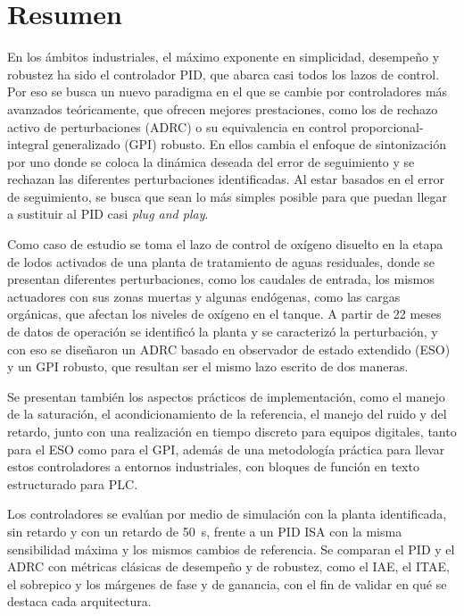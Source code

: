 \chapter*{Resumen}

En los ámbitos industriales, el máximo exponente en simplicidad, desempeño y robustez ha sido el
controlador PID, que abarca casi todos los lazos de control. Por eso se busca un nuevo paradigma en
el que se cambie por controladores más avanzados teóricamente, que ofrecen mejores prestaciones, como
los de rechazo activo de perturbaciones (ADRC) o su equivalencia en control
proporcional-integral generalizado (GPI) robusto. En ellos cambia el enfoque de sintonización por uno donde
se coloca la dinámica deseada del error de seguimiento y se rechazan las diferentes perturbaciones
identificadas. Al estar basados en el error de seguimiento, se busca que sean lo más simples posible
para que puedan llegar a sustituir al PID casi \emph{plug and play}.

Como caso de estudio se toma el lazo de control de oxígeno disuelto en la etapa de lodos activados
de una planta de tratamiento de aguas residuales, donde se presentan diferentes perturbaciones, como
los caudales de entrada, los mismos actuadores con sus zonas muertas y algunas endógenas, como las
cargas orgánicas, que afectan los niveles de oxígeno en el tanque. A partir de 22 meses de datos de
operación se identificó la planta y se caracterizó la perturbación, y con eso se diseñaron un ADRC
basado en observador de estado extendido (ESO) y un GPI robusto, que resultan ser el mismo lazo escrito de
dos maneras.

Se presentan también los aspectos prácticos de implementación, como el manejo de la saturación, el
acondicionamiento de la referencia, el manejo del ruido y del retardo, junto con una realización en
tiempo discreto para equipos digitales, tanto para el ESO como para el GPI, además de una metodología
práctica para llevar estos controladores a entornos industriales, con bloques de función en texto
estructurado para PLC.

Los controladores se evalúan por medio de simulación con la planta identificada, sin retardo y con un
retardo de 50~s, frente a un PID ISA con la misma sensibilidad máxima y los mismos cambios de
referencia. Se comparan el PID y el ADRC con métricas clásicas de desempeño y de robustez, como el IAE,
el ITAE, el sobrepico y los márgenes de fase y de ganancia, con el fin de validar en qué se destaca
cada arquitectura.

